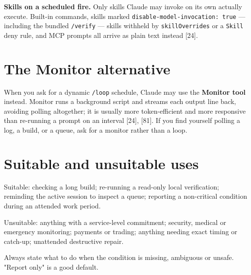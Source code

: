 \documentclass[11pt,a4paper,twoside,openany]{book}
\begin{document}
\textbf{Skills on a scheduled fire.} Only skills Claude may invoke on its own actually execute. Built-in commands, skills marked \texttt{disable-\allowbreak{}model-\allowbreak{}invocation:\allowbreak{} true} — including the bundled \texttt{/\allowbreak{}verify} — skills withheld by \texttt{skill\allowbreak{}Overrides} or a \texttt{Skill} deny rule, and MCP prompts all arrive as plain text instead [24].


\FloatBarrier
\setcounter{section}{3}
\section{The Monitor alternative}

When you ask for a dynamic \texttt{/\allowbreak{}loop} schedule, Claude may use the \textbf{Monitor tool} instead. Monitor runs a background script and streams each output line back, avoiding polling altogether; it is usually more token-efficient and more responsive than re-running a prompt on an interval [24], [81]. If you find yourself polling a log, a build, or a queue, ask for a monitor rather than a loop.


\FloatBarrier
\setcounter{section}{4}
\section{Suitable and unsuitable uses}

Suitable: checking a long build; re-running a read-only local verification; reminding the active session to inspect a queue; reporting a non-critical condition during an attended work period.


Unsuitable: anything with a service-level commitment; security, medical or emergency monitoring; payments or trading; anything needing exact timing or catch-up; unattended destructive repair.


Always state what to do when the condition is missing, ambiguous or unsafe. "Report only" is a good default.
\end{document}
